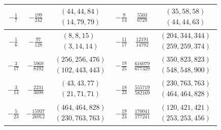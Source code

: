 \documentclass[11pt]{amsart}
\theoremstyle{plain}
\theoremstyle{remark}
\theoremstyle{plain}
\begin{document}
\begin{table}[H]
\begin{tabular}{c|c|c||c|c|c}
$-\frac{1}{7}$ &
$-\frac{199}{242}$ &
$\begin{array}{c}
(44,44,84)\\
(14,79,79)
\end{array}$
&
$-\frac{9}{14}$ &
$\frac{5503}{6728}$ &
$\begin{array}{c}
(35,58,58)\\
(44,44,63)
\end{array}$
\\
\hline

$-\frac{1}{6}$ &
$-\frac{97}{128}$ &
$\begin{array}{c}
(8,8,15)\\
(3,14,14)
\end{array}$
&
$-\frac{11}{17}$ &
$\frac{12191}{14792}$ &
$\begin{array}{c}
(204,344,344)\\
(259,259,374)
\end{array}$
\\
\hline

$-\frac{3}{17}$ &
$-\frac{5969}{8192}$ &
$\begin{array}{c}
(256,256,476)\\
(102,443,443)
\end{array}$
&
$-\frac{18}{25}$ &
$\frac{616079}{677329}$ &
$\begin{array}{c}
(350,823,823)\\
(548,548,900)
\end{array}$
\\
\hline

$-\frac{3}{14}$ &
$-\frac{2231}{3698}$ &
$\begin{array}{c}
(43,43,77)\\
(21,71,71)
\end{array}$
&
$-\frac{18}{23}$ &
$\frac{555719}{582169}$ &
$\begin{array}{c}
(230,763,763)\\
(464,464,828)
\end{array}$
\\
\hline

$-\frac{5}{23}$ &
$-\frac{15937}{26912}$ &
$\begin{array}{c}
(464,464,828)\\
(230,763,763)
\end{array}$
&
$-\frac{19}{24}$ &
$\frac{170041}{177241}$ &
$\begin{array}{c}
(120,421,421)\\
(253,253,456)
\end{array}$
\\
\hline


\end{tabular}
\end{table}
\end{document}
